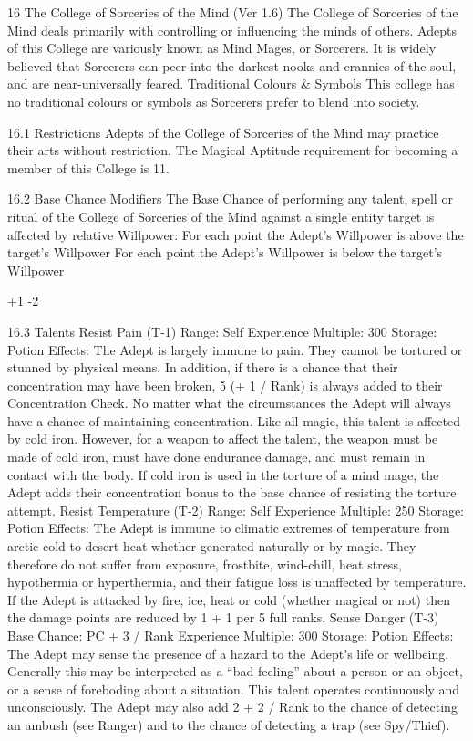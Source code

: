 \documentclass[a4paper]{article}
\begin{document}
\begin{multicols}{3}
16 The College of Sorceries of the Mind (Ver 1.6)
The College of Sorceries of the Mind deals primarily with controlling or influencing the minds of
others. Adepts of this College are variously known
as Mind Mages, or Sorcerers. It is widely believed
that Sorcerers can peer into the darkest nooks and
crannies of the soul, and are near-universally
feared.
Traditional Colours & Symbols
This college has no traditional colours or symbols
as Sorcerers prefer to blend into society.

16.1 Restrictions
Adepts of the College of Sorceries of the Mind
may practice their arts without restriction.
The Magical Aptitude requirement for becoming a
member of this College is 11.

16.2 Base Chance Modifiers
The Base Chance of performing any talent, spell or
ritual of the College of Sorceries of the Mind
against a single entity target is affected by relative
Willpower:
For each point the Adept’s Willpower is
above the target’s Willpower
For each point the Adept’s Willpower is
below the target’s Willpower

+1
-2

16.3 Talents
Resist Pain (T-1)
Range: Self
Experience Multiple: 300
Storage: Potion
Effects: The Adept is largely immune to pain. They
cannot be tortured or stunned by physical means.
In addition, if there is a chance that their concentration may have been broken, 5 (+ 1 / Rank) is always added to their Concentration Check. No
matter what the circumstances the Adept will always have a chance of maintaining concentration.
Like all magic, this talent is affected by cold iron.
However, for a weapon to affect the talent, the
weapon must be made of cold iron, must have done
endurance damage, and must remain in contact
with the body. If cold iron is used in the torture of
a mind mage, the Adept adds their concentration
bonus to the base chance of resisting the torture
attempt.
Resist Temperature (T-2)
Range: Self
Experience Multiple: 250
Storage: Potion
Effects: The Adept is immune to climatic extremes
of temperature from arctic cold to desert heat
whether generated naturally or by magic. They
therefore do not suffer from exposure, frostbite,
wind-chill, heat stress, hypothermia or hyperthermia, and their fatigue loss is unaffected by temperature. If the Adept is attacked by fire, ice, heat
or cold (whether magical or not) then the damage
points are reduced by 1 + 1 per 5 full ranks.
Sense Danger (T-3)
Base Chance: PC + 3 / Rank
Experience Multiple: 300
Storage: Potion
Effects: The Adept may sense the presence of a
hazard to the Adept’s life or wellbeing. Generally
this may be interpreted as a “bad feeling” about a
person or an object, or a sense of foreboding about
a situation. This talent operates continuously and
unconsciously. The Adept may also add 2 + 2 /
Rank to the chance of detecting an ambush (see
Ranger) and to the chance of detecting a trap (see
Spy/Thief).


\end{multicols}
\end{document}
